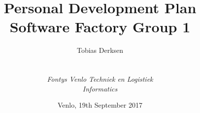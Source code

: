 
\def\Company{\textit{FSG1 - Fontys SoFa Group 1}}
\def\Institute{\textit{Fontys Venlo Techniek en Logistiek}}
\def\Course{\textit{Informatics}}

\def\BoldTitle{Personal Development Plan}
\def\Subtitle{Software Factory Group 1}
\def\Authors{Tobias Derksen}


\title{\textbf{\BoldTitle}\\\Subtitle}
\author{\Authors \\ \\ \\ \Institute\\ \Course}
\date{Venlo, 19th September 2017}

\newenvironment{goal}[1]{
	\label{goal:#1}
	
	
	\newcommand{\header}[1]{\textbf{##1}}
	\newcommand{\cellspace}{}
	\newcommand{\Row}[2]{\hline \header{##1} & \cellspace ##2 \cellspace \\}
	
	\newcommand{\Title}{
		\Row{Title}{#1}
	}

	\newcommand{\Description}[1]{
		\Row{Description}{##1}
	}

	\newcommand{\Measurement}[1]{
		\Row{Measurement}{##1}
	}

	\newcommand{\Criteria}[1]{
		\Row{Success Criteria}{##1}
	}

	\newcommand{\Forms}[1]{
		\Row{Forms}{##1}
	}
	
	\begin{doublespace}
		\begin{tabular}{|p{0.25\textwidth}|p{0.75\textwidth}|}
			\hline \multicolumn{2}{|c|}{\textbf{Learning Goal}} \\
			\Title
}
{
			\hline 
		\end{tabular} 
	\end{doublespace}
}